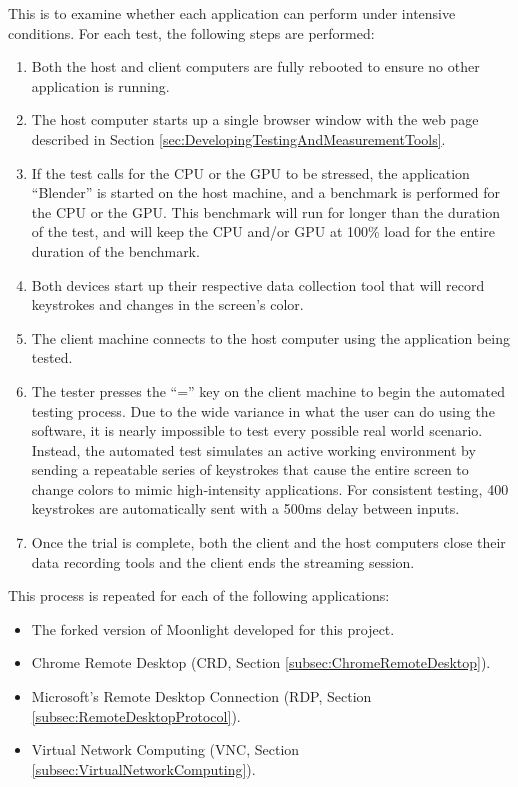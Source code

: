 \noindent
This is to examine whether each application can perform under intensive conditions.
For each test, the following steps are performed:

\begin{enumerate}
  \item Both the host and client computers are fully rebooted to ensure no other application is running.
  \item The host computer starts up a single browser window with the web page described in Section \ref{sec:DevelopingTestingAndMeasurementTools}.
  \item If the test calls for the CPU or the GPU to be stressed, the application \enquote{Blender} is started on the host machine, and a benchmark is performed for the CPU or the GPU.
        This benchmark will run for longer than the duration of the test, and will keep the CPU and/or GPU at 100\% load for the entire duration of the benchmark.
  \item Both devices start up their respective data collection tool that will record keystrokes and changes in the screen's color.
  \item The client machine connects to the host computer using the application being tested.
  \item The tester presses the \enquote{=} key on the client machine to begin the automated testing process.
        Due to the wide variance in what the user can do using the software, it is nearly impossible to test every possible real world scenario.
        Instead, the automated test simulates an active working environment by sending a repeatable series of keystrokes that cause the entire screen to change colors to mimic high-intensity applications.
        For consistent testing, 400 keystrokes are automatically sent with a 500ms delay between inputs.
  \item Once the trial is complete, both the client and the host computers close their data recording tools and the client ends the streaming session.
\end{enumerate}

\noindent
This process is repeated for each of the following applications:

\begin{itemize}
  \item The forked version of Moonlight developed for this project.
  \item Chrome Remote Desktop (CRD, Section \ref{subsec:ChromeRemoteDesktop}).
  \item Microsoft's Remote Desktop Connection (RDP, Section \ref{subsec:RemoteDesktopProtocol}).
  \item Virtual Network Computing (VNC, Section \ref{subsec:VirtualNetworkComputing}).
\end{itemize}

